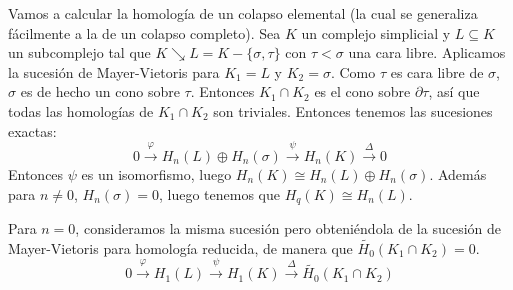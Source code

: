 \documentclass[HS.tex]{subfiles}
\begin{document}
\begin{ej}\label{colapso}
Vamos a calcular la homología de un colapso elemental (la cual se generaliza fácilmente a la de un colapso completo). Sea $K$ un complejo simplicial y $L\subseteq K$ un subcomplejo tal que $K\searrow L=K-\{\sigma,\tau\}$ con $\tau<\sigma$ una cara libre. Aplicamos la sucesión de Mayer-Vietoris para $K_1=L$ y $K_2=\sigma$. 
Como $τ$ es cara libre de $σ$, $σ$ es de hecho un cono sobre $τ$.
Entonces $K_1\cap K_2$ es el cono sobre $\partial\tau$, así que todas las homologías de $K_1\cap K_2$ son triviales.
Entonces tenemos las sucesiones exactas:
\[ 0 \xrightarrow{φ} H_n(L) \oplus H_n(σ) \xrightarrow{ψ} H_n(K) \xrightarrow{Δ} 0 \]
Entonces $ψ$ es un isomorfismo, luego $H_n(K) \cong H_n(L) \oplus H_n(σ)$.
Además para $n\neq 0$, $H_n(σ) = 0$, luego tenemos que $H_q(K) \cong H_n(L)$.

Para $n=0$, consideramos la misma sucesión pero obteniéndola de la sucesión de Mayer-Vietoris para homología reducida, de manera que $\tilde{H_0}(K_1 \cap K_2) = 0$.
\[ 0 \xrightarrow{φ} H_1(L) \xrightarrow{ψ} H_1(K) \xrightarrow{Δ} \tilde{H_0}(K_1 \cap K_2) \]
\end{ej}
\end{document}
